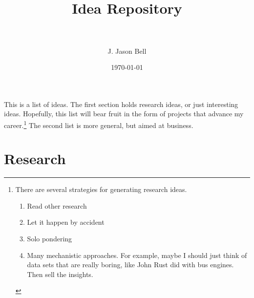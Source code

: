 \documentclass[paper=a4, fontsize=11pt]{scrartcl} %
\title{	
\normalfont \normalsize 
\horrule{0.5pt} \\[0.4cm] %
\huge Idea Repository \\ %
\horrule{2pt} \\[0.5cm] %
}
\author{J. Jason Bell} %
\date{\normalsize\today} %
\numberwithin{equation}{section} %
\numberwithin{figure}{section} %
\numberwithin{table}{section} %
\begin{document}
\maketitle %


This is a list of ideas.  The first section holds research ideas, or just interesting ideas.  Hopefully, this list will bear fruit in the form of projects that advance my career.\footnote{There are several strategies for generating research ideas.  
\begin{enumerate}
\item Read other research
\item Let it happen by accident
\item Solo pondering
\item Many mechanistic approaches.  For example, maybe I should just think of data sets that are really boring, like John Rust did with bus engines.  Then sell the insights.  
\end{enumerate}
}  The second list is more general, but aimed at business.   



\section{Research}
\end{document}
